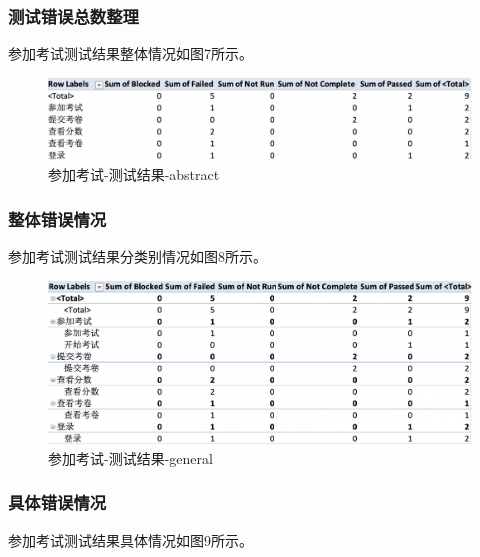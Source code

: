\documentclass[hyperref, a4paper]{ctexart}
\begin{document}
\hypertarget{ux6d4bux8bd5ux9519ux8befux603bux6570ux6574ux7406-2}{%
\subsubsection{测试错误总数整理}\label{ux6d4bux8bd5ux9519ux8befux603bux6570ux6574ux7406-2}}

参加考试测试结果整体情况如图7所示。

\begin{figure}
\centering
\includegraphics{screenshoots/PivotTable_abstract_3.png}
\caption{参加考试-测试结果-abstract}
\end{figure}

\hypertarget{ux6574ux4f53ux9519ux8befux60c5ux51b5-2}{%
\subsubsection{整体错误情况}\label{ux6574ux4f53ux9519ux8befux60c5ux51b5-2}}

参加考试测试结果分类别情况如图8所示。

\begin{figure}
\centering
\includegraphics{screenshoots/PivotTable_general_3.png}
\caption{参加考试-测试结果-general}
\end{figure}

\hypertarget{ux5177ux4f53ux9519ux8befux60c5ux51b5-2}{%
\subsubsection{具体错误情况}\label{ux5177ux4f53ux9519ux8befux60c5ux51b5-2}}

参加考试测试结果具体情况如图9所示。
\end{document}
